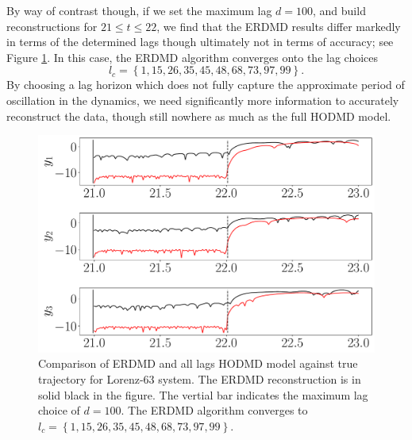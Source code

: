 \documentclass[a4paper,11pt]{article}
\begin{document}
By way of contrast though, if we set the maximum lag $d=100$, and build reconstructions for $21\leq t \leq 22$, we find that the ERDMD results differ  markedly in terms of the determined lags though ultimately not in terms of accuracy; see Figure \ref{fig:lorenz_compare_d_100}.  In this case, the ERDMD algorithm converges onto the lag choices 
$$
l_{c}=\left\{1,15, 26, 35, 45, 48, 68, 73, 97,99\right\}.
$$  By choosing a lag horizon which does not fully capture the approximate period of oscillation in the dynamics, we need significantly more information to accurately reconstruct the data, though still nowhere as much as the full HODMD model.  
\begin{figure}[!h]
\centering
\includegraphics[width=.8\textwidth]{Lorenz_error_compare_w_mx_lag_100}
\caption{Comparison of ERDMD and all lags HODMD model against true trajectory for Lorenz-63 system.  The ERDMD reconstruction is in solid black in the figure.  The vertial bar indicates the maximum lag choice of $d=100$. The ERDMD algorithm converges to $l_{c}=\left\{1,15, 26, 35, 45, 48, 68, 73, 97,99\right\}$.}
\label{fig:lorenz_compare_d_100}
\end{figure}
 
\end{document}
